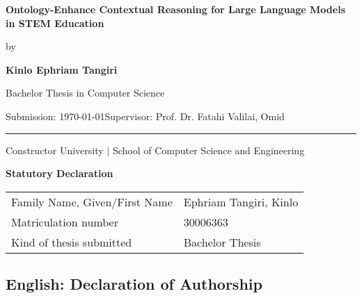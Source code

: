 \documentclass[a4paper,11pt,oneside]{article}
\newcommand{\mylastname}{Ephriam Tangiri}
\newcommand{\myfirstname}{Kinlo}
\newcommand{\mynumber}{30006363}
\newcommand{\myname}{\myfirstname{} \mylastname{}}
\newcommand{\mytitle}{Ontology-Enhance Contextual Reasoning for Large Language Models in STEM Education}
\newcommand{\mysupervisor}{Prof. Dr. Fatahi Valilai, Omid}
\begin{document}

  \thispagestyle{empty}

  \begin{flushright}
  \end{flushright}
  \vspace*{40mm}
  \begin{center}
    \huge
    \textbf{\mytitle}
  \end{center}
  \vspace*{4mm}
  \begin{center}
   \Large by
  \end{center}
  \vspace*{4mm}
  \begin{center}
    \LARGE
    \textbf{\myname}
  \end{center}
  \vspace*{20mm}
  \begin{center}
    \Large
    Bachelor Thesis in Computer Science
  \end{center}
  \vfill
  \begin{flushleft}
    \large
    Submission: \today \hfill Supervisor: \mysupervisor \\
    \rule{\textwidth}{1pt}
  \end{flushleft}
  \begin{center}
    Constructor University $|$ School of Computer Science and Engineering
  \end{center}

  \newpage
  \thispagestyle{empty}

  \begin{center}
    \Large \textbf{Statutory Declaration}
    \vspace*{8mm}
  \end{center}

  \begin{center}
    \begin{tabular}{|l|p{85mm}|}
      \hline
      Family Name, Given/First Name & \mylastname, \myfirstname \\
      Matriculation number & \mynumber \\
      Kind of thesis submitted & Bachelor Thesis \\
      \hline
    \end{tabular}
    \vspace*{8mm}
  \end{center}

  \subsection*{English: Declaration of Authorship}
 
\end{document}
